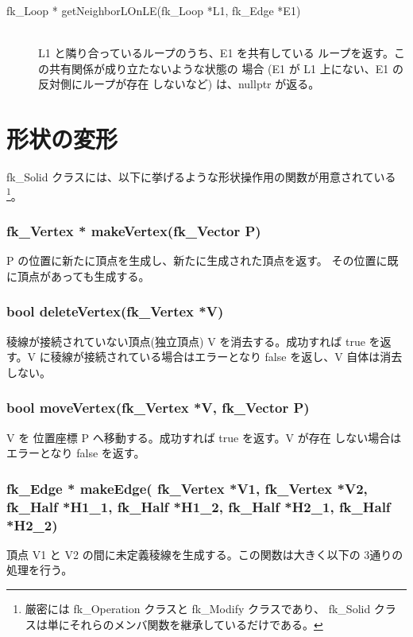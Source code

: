 \begin{description}
 \item[\hspace*{0.6cm}fk\_Loop *
	getNeighborLOnLE(fk\_Loop *L1, fk\_Edge *E1)] ~ \\
	L1 と隣り合っているループのうち、E1 を共有している
	ループを返す。この共有関係が成り立たないような状態の
	場合 (E1 が L1 上にない、E1 の反対側にループが存在
	しないなど) は、nullptr が返る。
\end{description}

\section{形状の変形} \label{sec:ModifySolid}
fk\_Solid クラスには、以下に挙げるような形状操作用の関数が用意されている
\footnote{厳密には fk\_Operation クラスと fk\_Modify クラスであり、
fk\_Solid クラスは単にそれらのメンバ関数を継承しているだけである。}。
 \subsubsection*{\hspace*{0.6cm}fk\_Vertex * makeVertex(fk\_Vector P)}
	P の位置に新たに頂点を生成し、新たに生成された頂点を返す。
	その位置に既に頂点があっても生成する。

 \subsubsection*{\hspace*{0.6cm}bool deleteVertex(fk\_Vertex *V)}
   	稜線が接続されていない頂点(独立頂点) V を消去する。成功すれば
	true を返す。V に稜線が接続されている場合はエラーとなり false
	を返し、V 自体は消去しない。


 \subsubsection*{\hspace*{0.6cm}bool moveVertex(fk\_Vertex *V, fk\_Vector P)}
	V を 位置座標 P へ移動する。成功すれば true を返す。V が存在
	しない場合はエラーとなり false を返す。


 \subsubsection*{\hspace*{0.6cm}fk\_Edge * makeEdge(
	fk\_Vertex *V1, fk\_Vertex *V2, \\ \hspace*{4.4cm}
	fk\_Half *H1\_1, fk\_Half *H1\_2,
	fk\_Half *H2\_1, fk\_Half *H2\_2)}
	頂点 V1 と V2 の間に未定義稜線を生成する。この関数は大きく以下の
	3通りの処理を行う。


